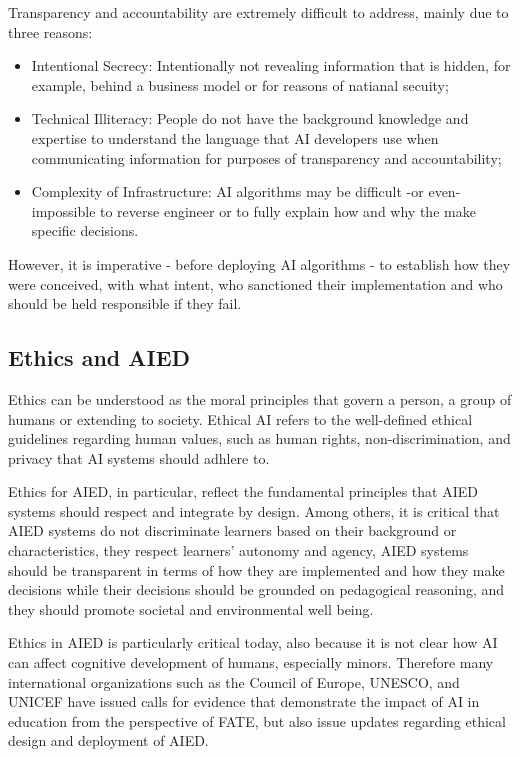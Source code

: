\documentclass[
]{book}
\providecommand{\tightlist}{%
  \setlength{\itemsep}{0pt}\setlength{\parskip}{0pt}}
\begin{document}
Transparency and accountability are extremely difficult to address, mainly due to three reasons:

\begin{itemize}
\tightlist
\item
  Intentional Secrecy: Intentionally not revealing information that is hidden, for example, behind a business model or for reasons of natianal secuity;
\item
  Technical Illiteracy: People do not have the background knowledge and expertise to understand the language that AI developers use when communicating information for purposes of transparency and accountability;
\item
  Complexity of Infrastructure: AI algorithms may be difficult -or even- impossible to reverse engineer or to fully explain how and why the make specific decisions.
\end{itemize}

However, it is imperative - before deploying AI algorithms - to establish how they were conceived, with what intent, who sanctioned their implementation and who should be held responsible if they fail.

\subsection{Ethics and AIED}\label{ethics-and-aied}

Ethics can be understood as the moral principles that govern a person, a group of humans or extending to society. Ethical AI refers to the well-defined ethical guidelines regarding human values, such as human rights, non-discrimination, and privacy that AI systems should adhlere to.

Ethics for AIED, in particular, reflect the fundamental principles that AIED systems should respect and integrate by design. Among others, it is critical that AIED systems do not discriminate learners based on their background or characteristics, they respect learners' autonomy and agency, AIED systems should be transparent in terms of how they are implemented and how they make decisions while their decisions should be grounded on pedagogical reasoning, and they should promote societal and environmental well being.

Ethics in AIED is particularly critical today, also because it is not clear how AI can affect cognitive development of humans, especially minors. Therefore many international organizations such as the Council of Europe, UNESCO, and UNICEF have issued calls for evidence that demonstrate the impact of AI in education from the perspective of FATE, but also issue updates regarding ethical design and deployment of AIED.
\end{document}
